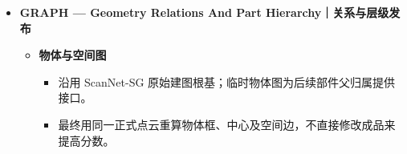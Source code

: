 \documentclass[UTF8,fontset=fandol]{ctexart}
\begin{document}
\begin{itemize}
\begin{itemize}
\begin{itemize}
\begin{itemize}
\item 门板保留为part，原实测坐标取并集；反复审核至无新关系。

\end{itemize}

\item \textbf{FDR — Fine Depth Recovery｜精细实测恢复}


\begin{itemize}
\item 小物体在原生身份掩码内使用逐像素深度、2毫米体素和至少3个独立视角；保留真实坐标。

\end{itemize}

\item \textbf{RSI — Repeated Surface Instances｜重复表面实例}


\begin{itemize}
\item RGB-D外缘沿高度出现多视角稳定周期时才拆分；实例数来自实测边缘，不来自类别或GT。


\item 顶部实测曲面作为共享先验，下层平移曲面标为生成；自由空间与原点残差否决不成立的假设。

\end{itemize}
\end{itemize}

\item \textbf{形状先验及验收}


\begin{itemize}
\item AdaPoinTr保持独立验收；在实测整体/部件归并后，由缓存名称选择形状族，实测正面、侧面、后界决定尺寸，全部帧检验形状假设。


\item 只发布通过当前准入的形状假设；生成点不充当实测或跟踪证据。

\end{itemize}
\end{itemize}

\item \textbf{GRAPH — Geometry Relations And Part Hierarchy｜关系与层级发布}


\begin{itemize}
\item \textbf{物体与空间图}


\begin{itemize}
\item 沿用 ScanNet-SG 原始建图根基；临时物体图为后续部件父归属提供接口。


\item 最终用同一正式点云重算物体框、中心及空间边，不直接修改成品来提高分数。



\end{itemize}
\end{itemize}
\end{itemize}
\end{document}
